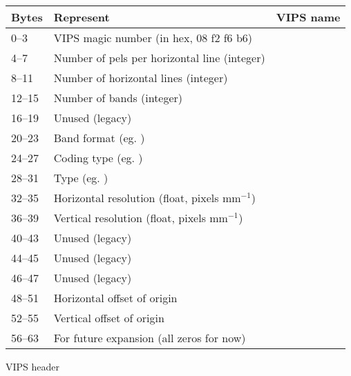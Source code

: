 \begin{tab2}
\begin{center}
\begin{tabular}{|l|l|l|}
\hline
Bytes  & Represent 					 & VIPS name \\
\hline
0--3   & VIPS magic number (in hex, 08 f2 f6 b6) 	 & \\
4--7   & Number of pels per horizontal line (integer) 	 & \ct{Xsize} \\
8--11  & Number of horizontal lines (integer) 		 & \ct{Ysize} \\
12--15 & Number of bands (integer) 			 & \ct{Bands} \\
16--19 & Unused (legacy) 				 & \ct{Bbits} \\
20--23 & Band format (eg. \ct{IM\_BANDFMT\_USHORT})	 & \ct{BandFmt} \\
24--27 & Coding type (eg. \ct{IM\_CODING\_NONE})	 & \ct{Coding} \\
28--31 & Type (eg. \ct{IM\_TYPE\_LAB})			 & \ct{Type} \\
32--35 & Horizontal resolution (float, pixels mm$^{-1}$) & \ct{Xres} \\
36--39 & Vertical resolution (float, pixels mm$^{-1}$)	 & \ct{Yres} \\
40--43 & Unused (legacy)				 & \ct{Length} \\
44--45 & Unused (legacy)				 & \ct{Compression} \\
46--47 & Unused (legacy)				 & \ct{Level} \\
48--51 & Horizontal offset of origin			 & \ct{Xoffset} \\
52--55 & Vertical offset of origin			 & \ct{Yoffset} \\
56--63 & For future expansion (all zeros for now)	 & \\
\hline
\end{tabular}
\end{center}
\caption{VIPS header\label{fg:header}}
\end{tab2}


